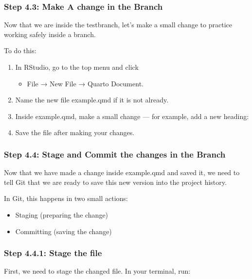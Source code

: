 \documentclass[
  11pt,
  a4paper,
]{article}
\providecommand{\tightlist}{%
  \setlength{\itemsep}{0pt}\setlength{\parskip}{0pt}}\usepackage{longtable,booktabs,array}
\begin{document}
\subsubsection{Step 4.3: Make A change in the
Branch}\label{step-4.3-make-a-change-in-the-branch}

Now that we are inside the testbranch, let's make a small change to
practice working safely inside a branch.

To do this:

\begin{enumerate}
\def\labelenumi{\arabic{enumi}.}
\item
  In RStudio, go to the top menu and click

  \begin{itemize}
  \tightlist
  \item
    File → New File → Quarto Document.
  \end{itemize}
\item
  Name the new file example.qmd if it is not already.
\item
  Inside example.qmd, make a small change --- for example, add a new
  heading:
\item
  Save the file after making your changes.
\end{enumerate}

\subsubsection{Step 4.4: Stage and Commit the changes in the
Branch}\label{step-4.4-stage-and-commit-the-changes-in-the-branch}

Now that we have made a change inside example.qmd and saved it, we need
to tell Git that we are ready to save this new version into the project
history.

In Git, this happens in two small actions:

\begin{itemize}
\item
  Staging (preparing the change)
\item
  Committing (saving the change)
\end{itemize}

\subsubsection{Step 4.4.1: Stage the
file}\label{step-4.4.1-stage-the-file}

First, we need to stage the changed file. In your terminal, run:
\end{document}
